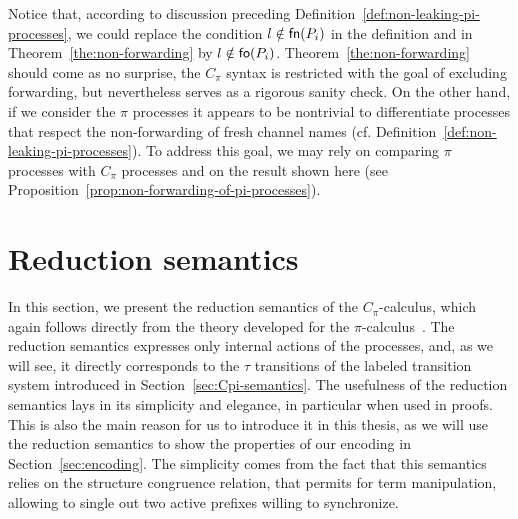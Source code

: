 Notice that, according to discussion preceding Definition~\ref{def:non-leaking-pi-processes}, we could replace the condition $l\notin\mathsf{fn}(P_i)$ in the definition and in Theorem~\ref{the:non-forwarding} by $l\notin\mathsf{fo}(P_i)$.
Theorem~\ref{the:non-forwarding} should come as no surprise, the $C_\pi$ syntax is restricted with the goal of excluding forwarding, but nevertheless serves as a rigorous sanity check. On the other hand, if we consider the $\pi$ processes it appears to be nontrivial to differentiate processes that respect the non-forwarding of fresh channel names (cf. Definition~\ref{def:non-leaking-pi-processes}). 
To address this goal, we may rely on comparing $\pi$ processes with $C_\pi$ processes and on the result shown here (see Proposition~\ref{prop:non-forwarding-of-pi-processes}). %








\section{Reduction semantics}\label{sec:Cpi-reduction-semantics}

In this section, we present the reduction semantics of the $C_\pi$-calculus, which again follows directly from  the theory developed for the $\pi$-calculus~\cite{pi_calculus}. 
The reduction semantics expresses only internal actions of the processes, and, as we will see, it directly corresponds to the $\tau$ transitions of the labeled transition system introduced in Section~\ref{sec:Cpi-semantics}. The usefulness of the reduction semantics lays in its simplicity and elegance, in particular when used in proofs. This is also the main reason for us to introduce it in this thesis, as we will use the reduction semantics to show the properties of our encoding in Section~\ref{sec:encoding}. 
The simplicity comes from the fact that this semantics relies on the structure congruence relation, that permits for term manipulation, allowing to single out two active prefixes willing to synchronize. 


